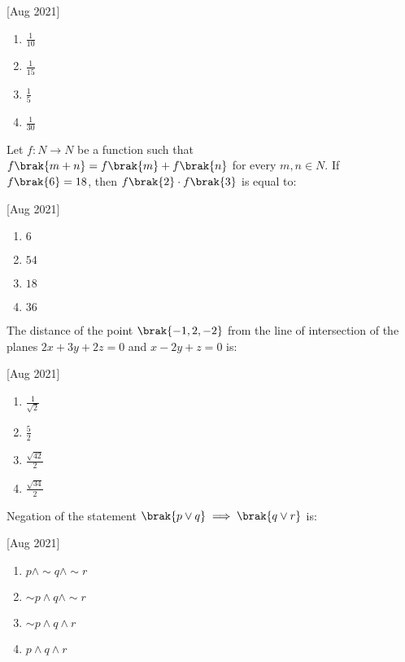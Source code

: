     \hfill[Aug 2021]

		\begin{multicols}{4}
			\begin{enumerate}
				\item $\frac{1}{10}$
				\item $\frac{1}{15}$
				\item $\frac{1}{5}$
				\item $\frac{1}{30}$
			\end{enumerate}
		\end{multicols}

    \item Let $f:N\to N$ be a function such that $f\brak{m+n}=f\brak{m}+f\brak{n}$ for every $m,n\in N$. If $f\brak{6}=18$, then $f\brak{2}\cdot f\brak{3}$ is equal to:
    
    \hfill[Aug 2021]

		\begin{multicols}{4}
			\begin{enumerate}
				\item $6$
				\item $54$
				\item $18$
				\item $36$
			\end{enumerate}
		\end{multicols}
  
    \item The distance of the point $\brak{-1, 2, -2}$ from the line of intersection of the planes $2x+3y+2z=0$ and $x-2y+z=0$ is:
    
    \hfill[Aug 2021]

        \begin{multicols}{4}
            \begin{enumerate}
                \item $\frac{1}{\sqrt{2}}$
                \item $\frac{5}{2}$
                \item $\frac{\sqrt{42}}{2}$
                \item $\frac{\sqrt{34}}{2}$
            \end{enumerate}
        \end{multicols}

    \item Negation of the statement $\brak{p\lor q}\implies\brak{q\lor r}$ is:
    
    \hfill[Aug 2021]

        \begin{multicols}{4}
            \begin{enumerate}
                \item $p\land \sim q\land \sim r$
                \item $\sim p\land q\land \sim r$
                \item $\sim p\land q\land r$
                \item $p\land q\land r$
            \end{enumerate}
        \end{multicols}
		
